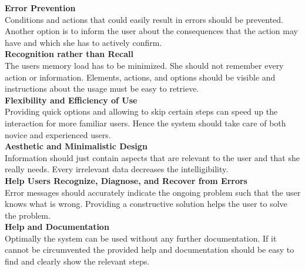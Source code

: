\textbf{Error Prevention}\\
Conditions and actions that could easily result in errors should be prevented. Another option is to inform the user about the consequences that the action may have and which she has to actively confirm.\\

\textbf{Recognition rather than Recall}\\
The users memory load has to be minimized. She should not remember every action or information. Elements, actions, and options should be visible and instructions about the usage must be easy to retrieve.\\

\textbf{Flexibility and Efficiency of Use}\\
Providing quick options and allowing to skip certain steps can speed up the interaction for more familiar users. Hence the system should take care of both novice and experienced users.\\

\textbf{Aesthetic and Minimalistic Design}\\
Information should just contain aspects that are relevant to the user and that she really needs. Every irrelevant data decreases the intelligibility.\\

\textbf{Help Users Recognize, Diagnose, and Recover from Errors}\\
Error messages should accurately indicate the ongoing problem such that the user knows what is wrong. Providing a constructive solution helps the user to solve the problem.\\

\textbf{Help and Documentation}\\
Optimally the system can be used without any further documentation. If it cannot be circumvented the provided help and documentation should be easy to find and clearly show the relevant steps.
\\

